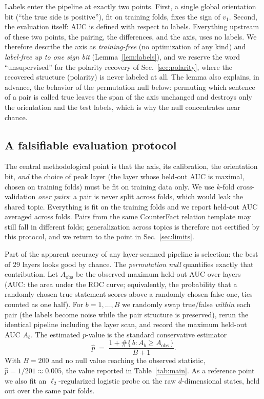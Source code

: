 \documentclass[11pt]{article}
\begin{document}
Labels enter the pipeline at exactly two points. First, a single global
orientation bit (``the true side is positive''), fit on training folds,
fixes the sign of $v_1$. Second, the evaluation itself: AUC is defined with
respect to labels. Everything upstream of these two points, the pairing, the
differences, and the axis, uses no labels. We therefore describe the axis as
\emph{training-free} (no optimization of any kind) and \emph{label-free up to
one sign bit} (Lemma~\ref{lem:labels}), and we reserve the word
``unsupervised'' for the polarity recovery of Sec.~\ref{sec:polarity}, where
the recovered structure (polarity) is never labeled at all. The lemma also
explains, in advance, the behavior of the permutation null below: permuting
which sentence of a pair is called true leaves the span of the axis
unchanged and destroys only the orientation and the test labels, which is why
the null concentrates near chance.

\subsection{A falsifiable evaluation protocol}
\label{sec:protocol}

The central methodological point is that the axis, its calibration, the
orientation bit, \emph{and} the choice of peak layer (the layer whose held-out AUC is maximal, chosen on training folds) must be fit on training
data only. We use $k$-fold cross-validation \emph{over pairs}: a pair is
never split across folds, which would leak the shared topic. Everything is
fit on the training folds and we report held-out AUC averaged across folds.
Pairs from the same CounterFact relation template may still fall in
different folds; generalization across topics is therefore not certified by
this protocol, and we return to the point in Sec.~\ref{sec:limits}.

Part of the apparent accuracy of any layer-scanned pipeline is selection: the
best of $29$ layers looks good by chance. The \emph{permutation null}
quantifies exactly that contribution. Let $A_{\mathrm{obs}}$ be the observed
maximum held-out AUC over layers (AUC: the area under the ROC curve; equivalently, the probability that a
randomly chosen true statement scores above a randomly chosen false one,
ties counted as one half). For $b = 1, \dots, B$ we randomly swap
true/false \emph{within} each pair (the labels become noise while the pair
structure is preserved), rerun the identical pipeline including the layer
scan, and record the maximum held-out AUC $A_b$. The estimated $p$-value is
the standard conservative estimator
\begin{equation}
\hat{p} \;=\; \frac{1 + \#\{\,b : A_b \ge A_{\mathrm{obs}}\,\}}{B + 1}.
\end{equation}
With $B = 200$ and no null value reaching the observed statistic,
$\hat{p} = 1/201 \approx 0.005$, the value reported in
Table~\ref{tab:main}. As a reference point we also fit an
$\ell_2$-regularized logistic probe on the raw $d$-dimensional states, held
out over the same pair folds.
\end{document}
